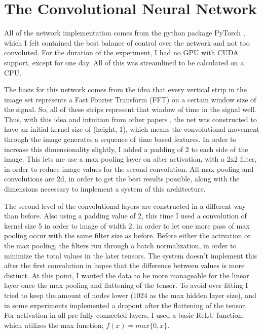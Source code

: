 \documentclass[10pt,twocolumn,letterpaper]{article}
\begin{document}
\section{The Convolutional Neural Network}
All of the network implementation comes from the python package PyTorch \cite{PyTorch}, which I felt contained the best balance of control over the network and not too convoluted. For the duration of the experiment, I had no GPU with CUDA support, except for one day. All of this was streamlined to be calculated on a CPU.

The basis for this network comes from the idea that every vertical strip in the image set represents a Fast Fourier Transform (FFT) on a certain window size of the signal. So, all of these strips represent that window of time in the signal well. Thus, with this idea and intuition from other papers \cite{WindowPaper}, the net was constructed to have an initial kernel size of (height, 1), which means the convolutional movement through the image generates a sequence of time based features. In order to increase this dimensionality slightly, I added a padding of 2 to each side of the image. This lets me use a max pooling layer on after activation, with a 2x2 filter, in order to reduce image values for the second convolution. All max pooling and convolutions are 2d, in order to get the best results possible, along with the dimensions necessary to implement a system of this architecture.

The second level of the convolutional layers are constructed in a different way than before. Also using a padding value of 2, this time I used a convolution of kernel size 5 in order to image of width 2, in order to let one more pass of max pooling occur with the same filter size as before. Before either the activation or the max pooling, the filters run through a batch normalization, in order to minimize the total values in the later tensors. The system doesn't implement this after the first convolution in hopes that the difference between values is more distinct. At this point, I wanted the data to be more manageable for the linear layer once the max pooling and flattening of the tensor. To avoid over fitting I tried to keep the amount of nodes lower (1024 as the max hidden layer size), and in some experiments implemented a dropout after the flattening of the tensor. For activation in all pre-fully connected layers, I used a basic ReLU function, which utilizes the max function; $ f(x) = max\{0 , x\} $.
\end{document}
